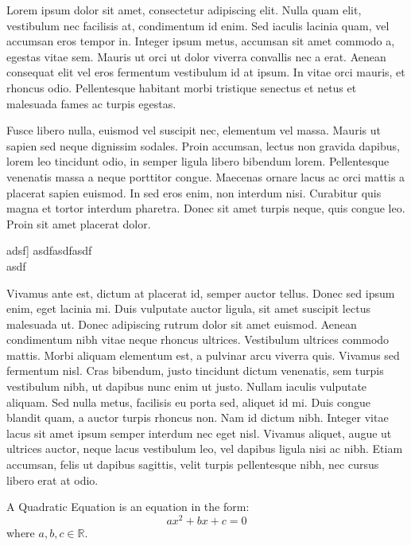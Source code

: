 \documentclass[a4paper,9pt]{scrartcl}
\makeatletter
\newcommand\LabFrame[2]{%
    \fboxrule=\FrameRule
    \fboxsep=-\errorsize
    \textcolor{FrameColor}{%
    \fbox{%
      \vbox{\nobreak
      \advance\FrameSep\errorsize
      \begingroup
        \advance\baselineskip\FrameSep
        \hrule height \baselineskip
        \nobreak
        \vskip-\baselineskip
      \endgroup
      \vskip 0.5\FrameSep
      \hbox{\hskip\FrameSep \strut
        \textcolor{TitleColor}{\textbf{#1}}}%
      \nobreak \nointerlineskip
      \vskip 1.3\FrameSep
      \hbox{\hskip\FrameSep
        {\normalcolor#2}%
        \hskip\FrameSep}%
      \vskip\FrameSep
    }}%
}}
\newenvironment{contlabelframe}[2][\Frame@Lab\ (cont.)]{%
  \def\Frame@Lab{#2}%
  \def\FrameCommand{\LabFrame{#2}}%
  \def\FirstFrameCommand{\LabFrame{#2}}%
  \def\MidFrameCommand{\LabFrame{#1}}%
  \def\LastFrameCommand{\LabFrame{#1}}%
  \MakeFramed{\advance\hsize-\width \FrameRestore} 
}{\endMakeFramed}
\newcounter{definition}
\newenvironment{definition}[1]{%
  \par
  \refstepcounter{definition}%
  \begin{contlabelframe}{Definition \thedefinition:\quad #1}
 \noindent\ignorespaces}
{\end{contlabelframe}}
\makeatother
\begin{document}
Lorem ipsum dolor sit amet, consectetur adipiscing elit. Nulla quam elit, vestibulum nec facilisis at, condimentum id enim. Sed iaculis lacinia quam, vel accumsan eros tempor in. Integer ipsum metus, accumsan sit amet commodo a, egestas vitae sem. Mauris ut orci ut dolor viverra convallis nec a erat. Aenean consequat elit vel eros fermentum vestibulum id at ipsum. In vitae orci mauris, et rhoncus odio. Pellentesque habitant morbi tristique senectus et netus et malesuada fames ac turpis egestas.

Fusce libero nulla, euismod vel suscipit nec, elementum vel massa. Mauris ut sapien sed neque dignissim sodales. Proin accumsan, lectus non gravida dapibus, lorem leo tincidunt odio, in semper ligula libero bibendum lorem. Pellentesque venenatis massa a neque porttitor congue. Maecenas ornare lacus ac orci mattis a placerat sapien euismod. In sed eros enim, non interdum nisi. Curabitur quis magna et tortor interdum pharetra. Donec sit amet turpis neque, quis congue leo. Proin sit amet placerat dolor.

 \begin{definition}[adsf]
asdfasdfasdf\\
asdf
 \end{definition}

Vivamus ante est, dictum at placerat id, semper auctor tellus. Donec sed ipsum enim, eget lacinia mi. Duis vulputate auctor ligula, sit amet suscipit lectus malesuada ut. Donec adipiscing rutrum dolor sit amet euismod. Aenean condimentum nibh vitae neque rhoncus ultrices. Vestibulum ultrices commodo mattis. Morbi aliquam elementum est, a pulvinar arcu viverra quis. Vivamus sed fermentum nisl. Cras bibendum, justo tincidunt dictum venenatis, sem turpis vestibulum nibh, ut dapibus nunc enim ut justo. Nullam iaculis vulputate aliquam. Sed nulla metus, facilisis eu porta sed, aliquet id mi. Duis congue blandit quam, a auctor turpis rhoncus non. Nam id dictum nibh. Integer vitae lacus sit amet ipsum semper interdum nec eget nisl. Vivamus aliquet, augue ut ultrices auctor, neque lacus vestibulum leo, vel dapibus ligula nisi ac nibh. Etiam accumsan, felis ut dapibus sagittis, velit turpis pellentesque nibh, nec cursus libero erat at odio.

\begin{definition}{Quadratic Equation}
A Quadratic Equation is an equation in the form:
\begin{equation}
ax^2+bx+c=0
\end{equation}
where \(a,b,c\in\mathbb{R}\).
\end{definition}
\end{document}
